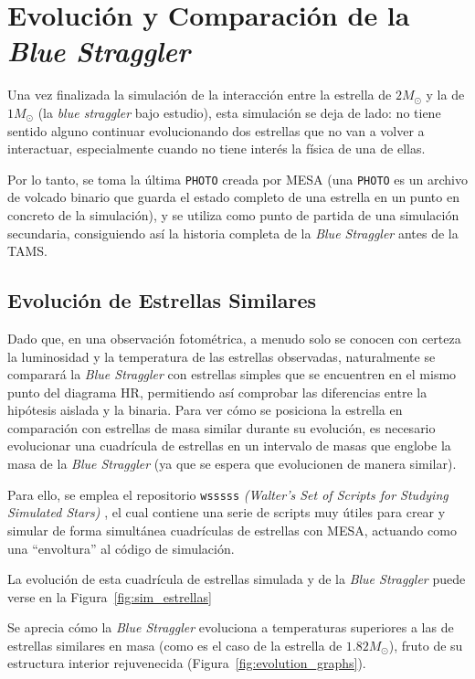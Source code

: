 \chapter{Evolución y Comparación de la \textit{Blue Straggler}}

Una vez finalizada la simulación de la interacción entre la estrella de $2 M_\odot$ y la de $1 M_\odot$ (la \textit{blue straggler} bajo estudio), esta simulación se deja de lado: no tiene sentido alguno continuar evolucionando dos estrellas que no van a volver a interactuar, especialmente cuando no tiene interés la física de una de ellas.

Por lo tanto, se toma la última \texttt{PHOTO} creada por MESA (una \texttt{PHOTO} es un archivo de volcado binario que guarda el estado completo de una estrella en un punto en concreto de la simulación), y se utiliza como punto de partida de una simulación secundaria, consiguiendo así la historia completa de la \textit{Blue Straggler} antes de la TAMS.

\section{Evolución de Estrellas Similares}

Dado que, en una observación fotométrica, a menudo solo se conocen con certeza la luminosidad y la temperatura de las estrellas observadas, naturalmente se comparará la \textit{Blue Straggler} con estrellas simples que se encuentren en el mismo punto del diagrama HR, permitiendo así comprobar las diferencias entre la hipótesis aislada y la binaria. Para ver cómo se posiciona la estrella en comparación con estrellas de masa similar durante su evolución, es necesario evolucionar una cuadrícula de estrellas en un intervalo de masas que englobe la masa de la \textit{Blue Straggler} (ya que se espera que evolucionen de manera similar).

Para ello, se emplea el repositorio \texttt{wsssss} \textit{(Walter's Set of Scripts for Studying Simulated Stars)} \citep{wsssss}, el cual contiene una serie de scripts muy útiles para crear y simular de forma simultánea cuadrículas de estrellas con MESA, actuando como una ``envoltura'' al código de simulación.

La evolución de esta cuadrícula de estrellas simulada y de la \textit{Blue Straggler} puede verse en la Figura~\ref{fig:sim_estrellas}

Se aprecia cómo la \textit{Blue Straggler} evoluciona a temperaturas superiores a las de estrellas similares en masa (como es el caso de la estrella de $1.82 M_\odot$), fruto de su estructura interior rejuvenecida (Figura~\ref{fig:evolution_graphs}).

